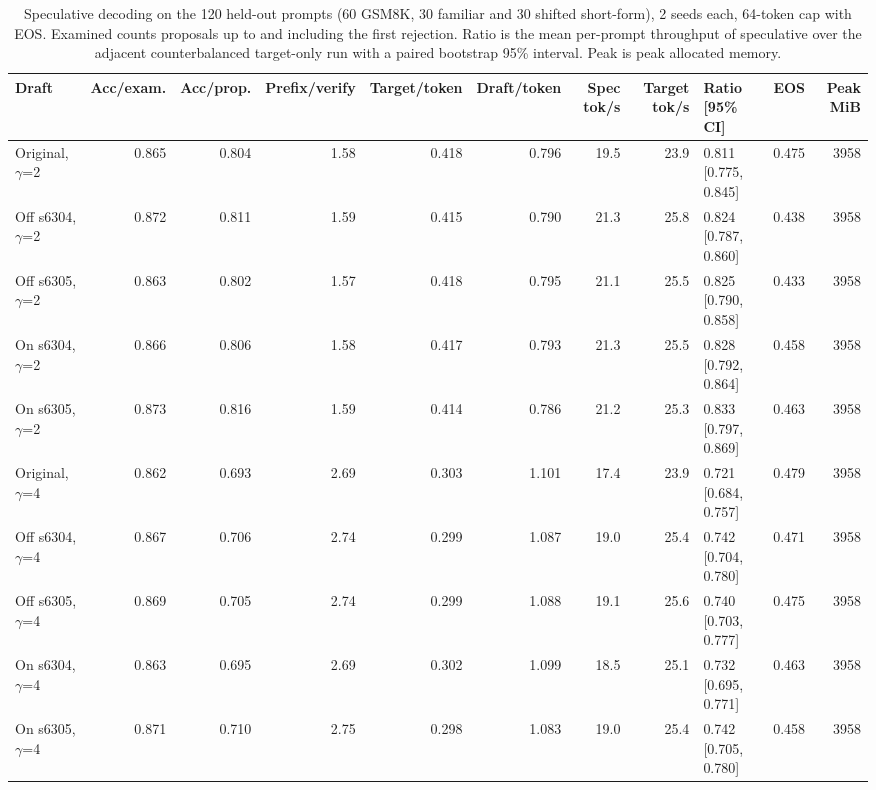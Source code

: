 \begin{table}[!htb]
\centering
\scriptsize
\setlength{\tabcolsep}{3.5pt}
\caption{Speculative decoding on the 120 held-out prompts (60 GSM8K, 30 familiar and 30 shifted short-form), 2 seeds each, 64-token cap with EOS. Examined counts proposals up to and including the first rejection. Ratio is the mean per-prompt throughput of speculative over the adjacent counterbalanced target-only run with a paired bootstrap 95\% interval. Peak is peak allocated memory.}
\label{tab:t3speed}
\begin{adjustbox}{max width=\linewidth}
\begin{tabular}{lrrrrrrrlrr}
\toprule
Draft & Acc/exam. & Acc/prop. & Prefix/verify & Target/token & Draft/token & Spec tok/s & Target tok/s & Ratio [95\% CI] & EOS & Peak MiB \\
\midrule
Original, $\gamma$=2 & 0.865 & 0.804 & 1.58 & 0.418 & 0.796 & 19.5 & 23.9 & 0.811 [0.775, 0.845] & 0.475 & 3958 \\
Off s6304, $\gamma$=2 & 0.872 & 0.811 & 1.59 & 0.415 & 0.790 & 21.3 & 25.8 & 0.824 [0.787, 0.860] & 0.438 & 3958 \\
Off s6305, $\gamma$=2 & 0.863 & 0.802 & 1.57 & 0.418 & 0.795 & 21.1 & 25.5 & 0.825 [0.790, 0.858] & 0.433 & 3958 \\
On s6304, $\gamma$=2 & 0.866 & 0.806 & 1.58 & 0.417 & 0.793 & 21.3 & 25.5 & 0.828 [0.792, 0.864] & 0.458 & 3958 \\
On s6305, $\gamma$=2 & 0.873 & 0.816 & 1.59 & 0.414 & 0.786 & 21.2 & 25.3 & 0.833 [0.797, 0.869] & 0.463 & 3958 \\
\midrule
Original, $\gamma$=4 & 0.862 & 0.693 & 2.69 & 0.303 & 1.101 & 17.4 & 23.9 & 0.721 [0.684, 0.757] & 0.479 & 3958 \\
Off s6304, $\gamma$=4 & 0.867 & 0.706 & 2.74 & 0.299 & 1.087 & 19.0 & 25.4 & 0.742 [0.704, 0.780] & 0.471 & 3958 \\
Off s6305, $\gamma$=4 & 0.869 & 0.705 & 2.74 & 0.299 & 1.088 & 19.1 & 25.6 & 0.740 [0.703, 0.777] & 0.475 & 3958 \\
On s6304, $\gamma$=4 & 0.863 & 0.695 & 2.69 & 0.302 & 1.099 & 18.5 & 25.1 & 0.732 [0.695, 0.771] & 0.463 & 3958 \\
On s6305, $\gamma$=4 & 0.871 & 0.710 & 2.75 & 0.298 & 1.083 & 19.0 & 25.4 & 0.742 [0.705, 0.780] & 0.458 & 3958 \\
\bottomrule
\end{tabular}
\end{adjustbox}
\end{table}
